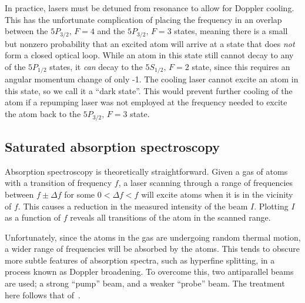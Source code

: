 \documentclass[11pt,twoside,a4paper]{article}
\begin{document}
In practice, lasers must be detuned from resonance to allow for Doppler cooling. This has the unfortunate complication of placing the frequency in an overlap between the \(5P_{3/2},\,F=4\) and the \(5P_{3/2},\,F=3\) states, meaning there is a small but nonzero probability that an
excited atom will arrive at a state that does \textit{not} form a closed optical loop. While an atom in this state still cannot decay to any of the \(5P_{1/2}\) states, it \textit{can} decay to the \(5S_{1/2},\,F=2\) state, since this requires an angular momentum change of only -1.
The cooling laser cannot excite an atom in this state, so we call it a ``dark state''. This would prevent further cooling of the atom if a repumping laser was not employed at the frequency needed to excite the atom back to the \(5P_{3/2},\,F=3\) state.
\subsection{Saturated absorption spectroscopy}
Absorption spectroscopy is theoretically straightforward. Given a gas of atoms with a transition of frequency \(f\), a laser scanning through a range of frequencies between \(f\pm\Delta f\) for some \(0<\Delta f<f\) will excite atoms when it is in the vicinity of \(f\). This causes a
reduction in the measured intensity of the beam \(I\). Plotting \(I\) as a function of \(f\) reveals all transitions of the atom in the scanned range.

Unfortunately, since the atoms in the gas are undergoing random thermal motion, a wider range of frequencies will be absorbed by the atoms. This tends to obscure more subtle features of absorption spectra, such as hyperfine splitting, in a process known as Doppler broadening. To overcome this, two antiparallel beams are used; a strong ``pump''
beam, and a weaker ``probe'' beam. The treatment here follows that of~\cite{satspec}.
\end{document}
